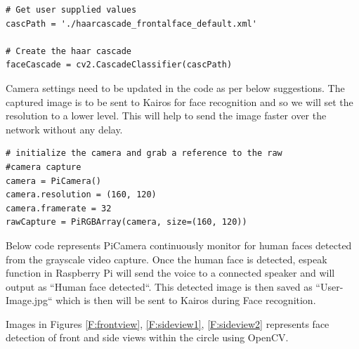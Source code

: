 \documentclass[sigconf]{acmart}
\begin{document}
\begin{verbatim}
# Get user supplied values
cascPath = './haarcascade_frontalface_default.xml'

# Create the haar cascade
faceCascade = cv2.CascadeClassifier(cascPath)
\end{verbatim}


Camera settings need to be updated in the code as per below suggestions. The captured image 
is to be sent to Kairos for face recognition and so we will set the resolution to a lower level. 
This will help to send the image faster over the network without any delay.


\begin{verbatim}
# initialize the camera and grab a reference to the raw 
#camera capture
camera = PiCamera()
camera.resolution = (160, 120)
camera.framerate = 32
rawCapture = PiRGBArray(camera, size=(160, 120))
\end{verbatim}


Below code represents PiCamera continuously monitor for human faces detected from the 
grayscale video capture. Once the human face is detected, espeak function in Raspberry Pi 
will send the voice to a connected speaker and will output as ``Human face detected``. 
This detected image is then saved as ``User-Image.jpg`` which is then will be sent to 
Kairos during Face recognition.

Images in Figures \ref{F:frontview}, \ref{F:sideview1}, \ref{F:sideview2} represents 
face detection of front and side views within the circle using OpenCV.
\end{document}
